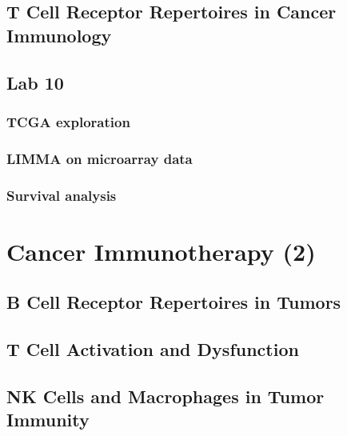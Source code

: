 \documentclass[
]{book}
\begin{document}
\hypertarget{t-cell-receptor-repertoires-in-cancer-immunology}{%
\section{T Cell Receptor Repertoires in Cancer Immunology}\label{t-cell-receptor-repertoires-in-cancer-immunology}}

\hypertarget{lab-10}{%
\section{Lab 10}\label{lab-10}}

\hypertarget{tcga-exploration}{%
\subsection{TCGA exploration}\label{tcga-exploration}}

\hypertarget{limma-on-microarray-data}{%
\subsection{LIMMA on microarray data}\label{limma-on-microarray-data}}

\hypertarget{survival-analysis-1}{%
\subsection{Survival analysis}\label{survival-analysis-1}}

\hypertarget{cancerimmuno2}{%
\chapter{Cancer Immunotherapy (2)}\label{cancerimmuno2}}

\hypertarget{b-cell-receptor-repertoires-in-tumors}{%
\section{B Cell Receptor Repertoires in Tumors}\label{b-cell-receptor-repertoires-in-tumors}}

\hypertarget{t-cell-activation-and-dysfunction}{%
\section{T Cell Activation and Dysfunction}\label{t-cell-activation-and-dysfunction}}

\hypertarget{nk-cells-and-macrophages-in-tumor-immunity}{%
\section{NK Cells and Macrophages in Tumor Immunity}\label{nk-cells-and-macrophages-in-tumor-immunity}}
\end{document}
